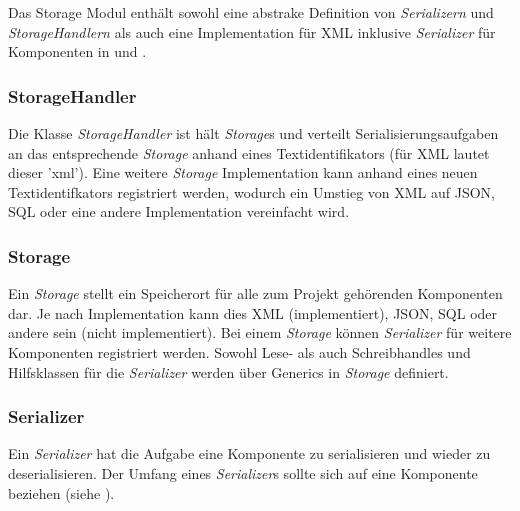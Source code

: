 Das Storage Modul enthält sowohl eine abstrake Definition von \textit{Serializern} und \textit{StorageHandlern}
als auch eine Implementation für XML inklusive \textit{Serializer} für Komponenten in  und
.

\subsubsection{StorageHandler}
Die Klasse \textit{StorageHandler} ist hält \textit{Storage}s und verteilt Serialisierungsaufgaben an
das entsprechende \textit{Storage} anhand eines Textidentifikators (für XML lautet dieser 'xml').
Eine weitere \textit{Storage} Implementation kann anhand eines neuen Textidentifkators registriert werden,
wodurch ein Umstieg von XML auf JSON, SQL oder eine andere Implementation vereinfacht wird.

\subsubsection{Storage}
Ein \textit{Storage} stellt ein Speicherort für alle zum Projekt gehörenden Komponenten dar. Je nach
Implementation kann dies XML (implementiert), JSON, SQL oder andere sein (nicht implementiert). Bei einem
\textit{Storage} können \textit{Serializer} für weitere Komponenten registriert werden. Sowohl Lese- als
auch Schreibhandles und Hilfsklassen für die \textit{Serializer} werden über Generics in \textit{Storage}
definiert.

\subsubsection{Serializer}
Ein \textit{Serializer} hat die Aufgabe eine Komponente zu serialisieren und wieder zu deserialisieren.
Der Umfang eines \textit{Serializer}s sollte sich auf eine Komponente beziehen (siehe ).